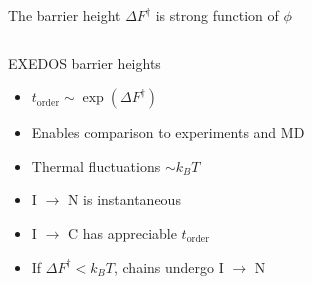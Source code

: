 \documentclass[aspectratio=169]{beamer}
\begin{document}
\begin{frame}[c]{The barrier height $\Delta F^{\dagger}$ is strong function of $\phi$}
\begin{columns}[T]
    \begin{block}{EXEDOS barrier heights}
    \begin{itemize}
      \setlength\itemsep{.5em}
      \item $t_{\mathrm{order}} \sim \exp \left( \Delta F^{\dagger} \right)$
      \item Enables comparison to experiments and MD
      \item Thermal fluctuations $\sim k_{B}T$
      \item I $\rightarrow$ N is instantaneous
      \item I $\rightarrow$ C has appreciable $t_{\mathrm{order}}$
      \item If $\Delta F^{\dagger} < k_{B}T$, chains undergo I $\rightarrow$ N
    \end{itemize}
    \end{block}

  \end{columns}

  \par\leavevmode


\end{frame}
\end{document}
